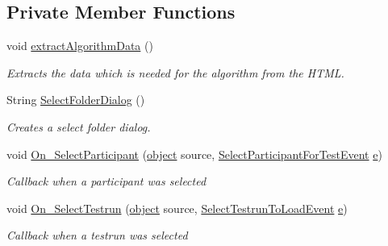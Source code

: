 \subsection*{Private Member Functions}
\begin{DoxyCompactItemize}
\item 
void \hyperlink{class_web_analyzer_1_1_u_i_1_1_interaction_objects_1_1_analysis_export_control_a8b17d64f1b1f9992923cb0d15f9b1b18}{extract\+Algorithm\+Data} ()
\begin{DoxyCompactList}\small\item\em Extracts the data which is needed for the algorithm from the H\+T\+M\+L. \end{DoxyCompactList}\item 
String \hyperlink{class_web_analyzer_1_1_u_i_1_1_interaction_objects_1_1_analysis_export_control_ad0c70b4203f88526cb2dc146eae6ac5c}{Select\+Folder\+Dialog} ()
\begin{DoxyCompactList}\small\item\em Creates a select folder dialog. \end{DoxyCompactList}\item 
void \hyperlink{class_web_analyzer_1_1_u_i_1_1_interaction_objects_1_1_analysis_export_control_afa9fed7468d8f513be28ec140f00b308}{On\+\_\+\+Select\+Participant} (\hyperlink{_u_i_2_h_t_m_l_resources_2js_2lib_2underscore_8min_8js_aae18b7515bb2bc4137586506e7c0c903}{object} source, \hyperlink{class_web_analyzer_1_1_events_1_1_select_participant_for_test_event}{Select\+Participant\+For\+Test\+Event} \hyperlink{_u_i_2_h_t_m_l_resources_2js_2lib_2bootstrap_8min_8js_ab5902775854a8b8440bcd25e0fe1c120}{e})
\begin{DoxyCompactList}\small\item\em Callback when a participant was selected \end{DoxyCompactList}\item 
void \hyperlink{class_web_analyzer_1_1_u_i_1_1_interaction_objects_1_1_analysis_export_control_a3317d4651e2e761dd9a649abd1b5b5e6}{On\+\_\+\+Select\+Testrun} (\hyperlink{_u_i_2_h_t_m_l_resources_2js_2lib_2underscore_8min_8js_aae18b7515bb2bc4137586506e7c0c903}{object} source, \hyperlink{class_web_analyzer_1_1_events_1_1_select_testrun_to_load_event}{Select\+Testrun\+To\+Load\+Event} \hyperlink{_u_i_2_h_t_m_l_resources_2js_2lib_2bootstrap_8min_8js_ab5902775854a8b8440bcd25e0fe1c120}{e})
\begin{DoxyCompactList}\small\item\em Callback when a testrun was selected \end{DoxyCompactList}\item 

\end{DoxyCompactItemize}

